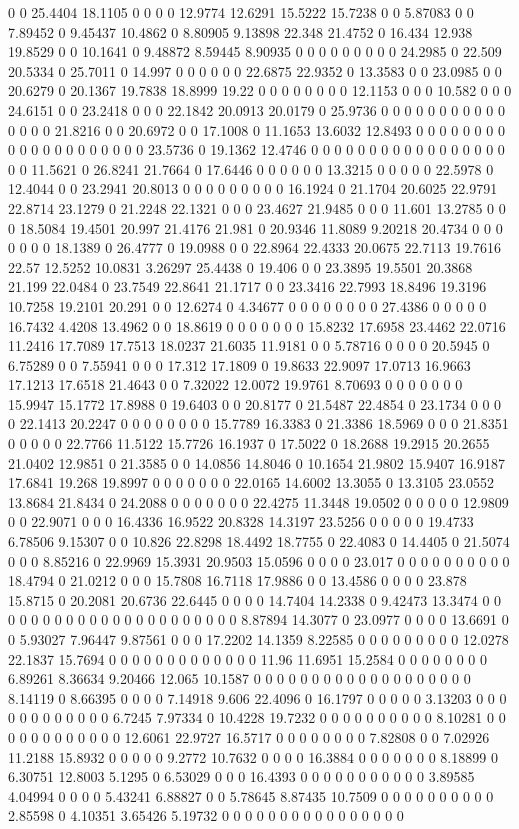0 0 25.4404 18.1105 0 0 0 0 12.9774 12.6291 15.5222 15.7238 0 0 5.87083 0 0 7.89452 0 9.45437 10.4862 0 8.80905 9.13898 22.348 21.4752 0 16.434 12.938 19.8529 0 0 10.1641 0 9.48872 8.59445 8.90935 0 0 0 0 0 0 0 0 0 24.2985 0 22.509 20.5334 0 25.7011 0 14.997 0 0 0 0 0 0 22.6875 22.9352 0 13.3583 0 0 23.0985 0 0 20.6279 0 20.1367 19.7838 18.8999 19.22 0 0 0 0 0 0 0 0 12.1153 0 0 0 10.582 0 0 0 24.6151 0 0 23.2418 0 0 0 22.1842 20.0913 20.0179 0 25.9736 0 0 0 0 0 0 0 0 0 0 0 0 0 0 0 21.8216 0 0 20.6972 0 0 17.1008 0 11.1653 13.6032 12.8493 0 0 0 0 0 0 0 0 0 0 0 0 0 0 0 0 0 0 0 0 23.5736 0 19.1362 12.4746 0 0 0 0 0 0 0 0 0 0 0 0 0 0 0 0 0 0 0 11.5621 0 26.8241 21.7664 0 17.6446 0 0 0 0 0 0 13.3215 0 0 0 0 0 22.5978 0 12.4044 0 0 23.2941 20.8013 0 0 0 0 0 0 0 0 0 16.1924 0 21.1704 20.6025 22.9791 22.8714 23.1279 0 21.2248 22.1321 0 0 0 23.4627 21.9485 0 0 0 11.601 13.2785 0 0 0 18.5084 19.4501 20.997 21.4176 21.981 0 20.9346 11.8089 9.20218 20.4734 0 0 0 0 0 0 0 18.1389 0 26.4777 0 19.0988 0 0 22.8964 22.4333 20.0675 22.7113 19.7616 22.57 12.5252 10.0831 3.26297 25.4438 0 19.406 0 0 23.3895 19.5501 20.3868 21.199 22.0484 0 23.7549 22.8641 21.1717 0 0 23.3416 22.7993 18.8496 19.3196 10.7258 19.2101 20.291 0 0 12.6274 0 4.34677 0 0 0 0 0 0 0 0 27.4386 0 0 0 0 0 16.7432 4.4208 13.4962 0 0 18.8619 0 0 0 0 0 0 0 15.8232 17.6958 23.4462 22.0716 11.2416 17.7089 17.7513 18.0237 21.6035 11.9181 0 0 5.78716 0 0 0 0 20.5945 0 6.75289 0 0 7.55941 0 0 0 17.312 17.1809 0 19.8633 22.9097 17.0713 16.9663 17.1213 17.6518 21.4643 0 0 7.32022 12.0072 19.9761 8.70693 0 0 0 0 0 0 0 15.9947 15.1772 17.8988 0 19.6403 0 0 20.8177 0 21.5487 22.4854 0 23.1734 0 0 0 0 22.1413 20.2247 0 0 0 0 0 0 0 0 15.7789 16.3383 0 21.3386 18.5969 0 0 0 21.8351 0 0 0 0 0 22.7766 11.5122 15.7726 16.1937 0 17.5022 0 18.2688 19.2915 20.2655 21.0402 12.9851 0 21.3585 0 0 14.0856 14.8046 0 10.1654 21.9802 15.9407 16.9187 17.6841 19.268 19.8997 0 0 0 0 0 0 0 22.0165 14.6002 13.3055 0 13.3105 23.0552 13.8684 21.8434 0 24.2088 0 0 0 0 0 0 0 22.4275 11.3448 19.0502 0 0 0 0 0 12.9809 0 0 22.9071 0 0 0 16.4336 16.9522 20.8328 14.3197 23.5256 0 0 0 0 0 19.4733 6.78506 9.15307 0 0 10.826 22.8298 18.4492 18.7755 0 22.4083 0 14.4405 0 21.5074 0 0 0 8.85216 0 22.9969 15.3931 20.9503 15.0596 0 0 0 0 23.017 0 0 0 0 0 0 0 0 0 0 18.4794 0 21.0212 0 0 0 15.7808 16.7118 17.9886 0 0 13.4586 0 0 0 0 23.878 15.8715 0 20.2081 20.6736 22.6445 0 0 0 0 14.7404 14.2338 0 9.42473 13.3474 0 0 0 0 0 0 0 0 0 0 0 0 0 0 0 0 0 0 0 0 0 0 8.87894 14.3077 0 23.0977 0 0 0 0 13.6691 0 0 5.93027 7.96447 9.87561 0 0 0 17.2202 14.1359 8.22585 0 0 0 0 0 0 0 0 0 12.0278 22.1837 15.7694 0 0 0 0 0 0 0 0 0 0 0 0 0 11.96 11.6951 15.2584 0 0 0 0 0 0 0 0 6.89261 8.36634 9.20466 12.065 10.1587 0 0 0 0 0 0 0 0 0 0 0 0 0 0 0 0 0 0 0 8.14119 0 8.66395 0 0 0 0 7.14918 9.606 22.4096 0 16.1797 0 0 0 0 0 3.13203 0 0 0 0 0 0 0 0 0 0 0 0 6.7245 7.97334 0 10.4228 19.7232 0 0 0 0 0 0 0 0 0 0 8.10281 0 0 0 0 0 0 0 0 0 0 0 0 12.6061 22.9727 16.5717 0 0 0 0 0 0 0 0 7.82808 0 0 7.02926 11.2188 15.8932 0 0 0 0 0 9.2772 10.7632 0 0 0 0 16.3884 0 0 0 0 0 0 0 8.18899 0 6.30751 12.8003 5.1295 0 6.53029 0 0 0 16.4393 0 0 0 0 0 0 0 0 0 0 0 3.89585 4.04994 0 0 0 0 5.43241 6.88827 0 0 5.78645 8.87435 10.7509 0 0 0 0 0 0 0 0 0 0 2.85598 0 4.10351 3.65426 5.19732 0 0 0 0 0 0 0 0 0 0 0 0 0 0 0 0 